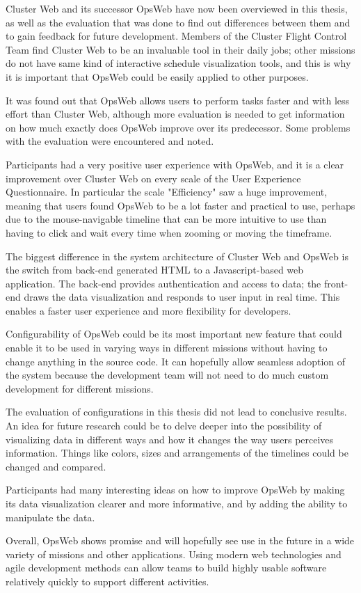 
Cluster Web and its successor OpsWeb have now been overviewed in this thesis, as well as the evaluation that was done to find out differences between them and to gain feedback for future development. Members of the Cluster Flight Control Team find Cluster Web to be an invaluable tool in their daily jobs; other missions do not have same kind of interactive schedule visualization tools, and this is why it is important that OpsWeb could be easily applied to other purposes.

It was found out that OpsWeb allows users to perform tasks faster and with less effort than Cluster Web, although more evaluation is needed to get information on how much exactly does OpsWeb improve over its predecessor. Some problems with the evaluation were encountered and noted.

Participants had a very positive user experience with OpsWeb, and it is a clear improvement over Cluster Web on every scale of the User Experience Questionnaire. In particular the scale "Efficiency" saw a huge improvement, meaning that users found OpsWeb to be a lot faster and practical to use, perhaps due to the mouse-navigable timeline that can be more intuitive to use than having to click and wait every time when zooming or moving the timeframe.

The biggest difference in the system architecture of Cluster Web and OpsWeb is the switch from back-end generated HTML to a Javascript-based web application. The back-end provides authentication and access to data; the front-end draws the data visualization and responds to user input in real time. This enables a faster user experience and more flexibility for developers.

Configurability of OpsWeb could be its most important new feature that could enable it to be used in varying ways in different missions without having to change anything in the source code. It can hopefully allow seamless adoption of the system because the development team will not need to do much custom development for different missions.

The evaluation of configurations in this thesis did not lead to conclusive results. An idea for future research could be to delve deeper into the possibility of visualizing data in different ways and how it changes the way users perceives information. Things like colors, sizes and arrangements of the timelines could be changed and compared.

Participants had many interesting ideas on how to improve OpsWeb by making its data visualization clearer and more informative, and by adding the ability to manipulate the data.

Overall, OpsWeb shows promise and will hopefully see use in the future in a wide variety of missions and other applications. Using modern web technologies and agile development methods can allow teams to build highly usable software relatively quickly to support different activities.